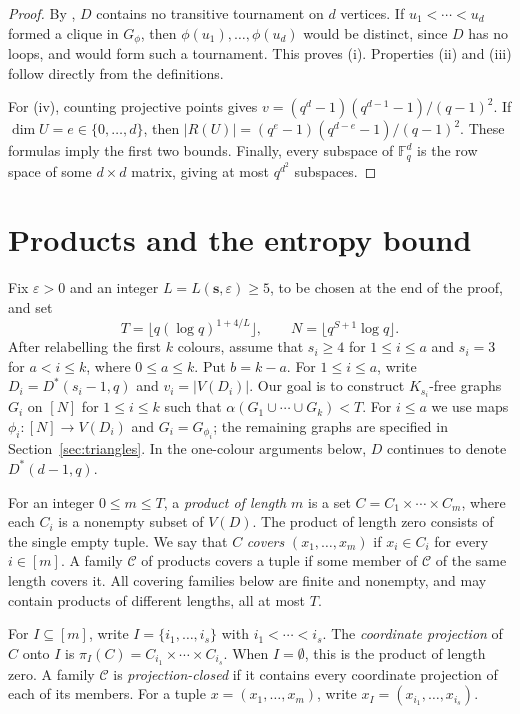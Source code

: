 \documentclass[11pt,a4paper]{article}
\numberwithin{equation}{section}
\newcommand{\Fq}{\mathbb F_q}
\newcommand{\cC}{\mathcal C}
\newcommand{\eps}{\varepsilon}
\begin{document}
\begin{proof}
By \cite[Lemma~2.11, with parameter $d-1$]{Bradac}, $D$ contains
no transitive tournament on $d$ vertices.
If $u_1<\cdots<u_d$ formed a clique in $G_\phi$, then
$\phi(u_1),\ldots,\phi(u_d)$ would be distinct, since $D$ has no
loops, and would form such a tournament. This proves (i).
Properties (ii) and (iii) follow directly from the definitions.

For (iv), counting projective points gives
$v=(q^d-1)(q^{d-1}-1)/(q-1)^2$.
If $\dim U=e\in\{0,\ldots,d\}$, then
$|R(U)|=(q^e-1)(q^{d-e}-1)/(q-1)^2$.
These formulas imply the first two bounds.
Finally, every subspace of $\Fq^d$ is the row space of some
$d\times d$ matrix, giving at most $q^{d^2}$ subspaces.
\end{proof}

\section{Products and the entropy bound}\label{sec:products}

Fix $\eps>0$ and an integer $L=L(\boldsymbol{s},\eps)\ge5$, to be chosen at
the end of the proof, and set
\begin{equation}\label{eq:scale}
 T=\lfloor q(\log q)^{1+4/L}\rfloor,\qquad
 N=\lfloor q^{S+1}\log q\rfloor.
\end{equation}
After relabelling the first $k$ colours, assume that $s_i\ge4$
for $1\le i\le a$ and $s_i=3$ for $a<i\le k$, where $0\le a\le k$.
Put $b=k-a$. For $1\le i\le a$, write
$D_i=D^*(s_i-1,q)$ and $v_i=|V(D_i)|$.
Our goal is to construct $K_{s_i}$-free graphs $G_i$ on $[N]$
for $1\le i\le k$ such that $\alpha(G_1\cup\cdots\cup G_k)<T$.
For $i\le a$ we use maps $\phi_i:[N]\to V(D_i)$ and
$G_i=G_{\phi_i}$; the remaining graphs are specified in
Section~\ref{sec:triangles}. In the one-colour arguments below,
$D$ continues to denote $D^*(d-1,q)$.

For an integer $0\le m\le T$, a \emph{product of length $m$}
is a set $C=C_1\times\cdots\times C_m$, where each
$C_i$ is a nonempty subset of $V(D)$.
The product of length zero consists of the single empty tuple.
We say that $C$ \emph{covers} $(x_1,\ldots,x_m)$ if
$x_i\in C_i$ for every $i\in[m]$.
A family $\cC$ of products covers a tuple if some member of
$\cC$ of the same length covers it. All covering families below
are finite and nonempty, and may contain products of different
lengths, all at most $T$.

For $I\subseteq[m]$, write $I=\{i_1,\ldots,i_s\}$ with
$i_1<\cdots<i_s$. The \emph{coordinate projection} of $C$ onto
$I$ is $\pi_I(C)=C_{i_1}\times\cdots\times C_{i_s}$.
When $I=\emptyset$, this is the product of length zero.
A family $\cC$ is \emph{projection-closed} if it contains every
coordinate projection of each of its members.
For a tuple $x=(x_1,\ldots,x_m)$, write
$x_I=(x_{i_1},\ldots,x_{i_s})$.
\end{document}
